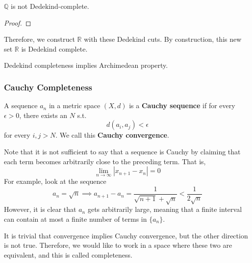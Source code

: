 \documentclass{article}
\begin{document}
      \begin{theorem}
        $\mathbb{Q}$ is not Dedekind-complete. 
      \end{theorem}
      \begin{proof}
        
      \end{proof}

      Therefore, we construct $\mathbb{R}$ with these Dedekind cuts. By construction, this new set $\mathbb{R}$ is Dedekind complete. 

      \begin{theorem}
        Dedekind completeness implies Archimedean property. 
      \end{theorem}

    \subsubsection{Cauchy Completeness} 

      \begin{definition}
        A sequence $a_n$ in a metric space $(X, d)$ is a \textbf{Cauchy sequence} if for every $\epsilon > 0$, there exists an $N$ s.t. 
        \begin{equation}
          d(a_i, a_j) < \epsilon
        \end{equation}
        for every $i, j > N$. We call this \textbf{Cauchy convergence}. 
      \end{definition}

      Note that it is not sufficient to say that a sequence is Cauchy by claiming that each term becomes arbitrarily close to the preceding term. That is, 
      \begin{equation}
        \lim_{n \rightarrow \infty} |x_{n+1} - x_{n}| = 0
      \end{equation}
      For example, look at the sequence 
      \begin{equation}
        a_n = \sqrt{n} \implies a_{n+1} - a_{n} = \frac{1}{\sqrt{n+1} + \sqrt{n}} < \frac{1}{2\sqrt{n}}
      \end{equation}
      However, it is clear that $a_n$ gets arbitrarily large, meaning that a finite interval can contain at most a finite number of terms in $\{a_n\}$. 

      It is trivial that convergence implies Cauchy convergence, but the other direction is not true. Therefore, we would like to work in a space where these two are equivalent, and this is called completeness. 
\end{document}
